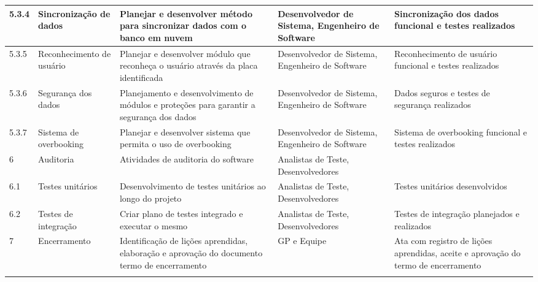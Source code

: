 \begin{longtable}{ l  p{}  p{}  p{}  p{}  }
		5.3.4       & Sincronização de dados                                  & Planejar e desenvolver método para sincronizar dados com o banco em nuvem & Desenvolvedor de Sistema, Engenheiro de Software & Sincronização dos dados funcional e testes realizados \\*
		\midrule
		5.3.5       & Reconhecimento de usuário                                & Planejar e desenvolver módulo que reconheça o usuário através da placa identificada & Desenvolvedor de Sistema, Engenheiro de Software & Reconhecimento de usuário funcional e testes realizados \\*
		\midrule
		5.3.6       & Segurança dos dados                                      & Planejamento e desenvolvimento de módulos e proteções para garantir a segurança dos dados & Desenvolvedor de Sistema, Engenheiro de Software & Dados seguros e testes de segurança realizados \\*
		\midrule
		5.3.7       & Sistema de overbooking                                    & Planejar e desenvolver sistema que permita o uso de overbooking & Desenvolvedor de Sistema, Engenheiro de Software & Sistema de overbooking funcional e testes realizados \\*
		\midrule
		6           & Auditoria                                                 & Atividades de auditoria do software & Analistas de Teste, Desenvolvedores & \\*
		\midrule
		6.1         & Testes unitários                                         & Desenvolvimento de testes unitários ao longo do projeto & Analistas de Teste, Desenvolvedores & Testes unitários desenvolvidos \\*
		\midrule
		6.2         & Testes de integração                                    & Criar plano de testes integrado e executar o mesmo & Analistas de Teste, Desenvolvedores & Testes de integração planejados e realizados \\*
		\midrule
		7           & Encerramento                                              & Identificação de lições aprendidas, elaboração e aprovação do documento termo de encerramento & GP e Equipe & Ata com registro de lições aprendidas, aceite e aprovação do termo de encerramento \\*
		\bottomrule
	\centering
\end{longtable}